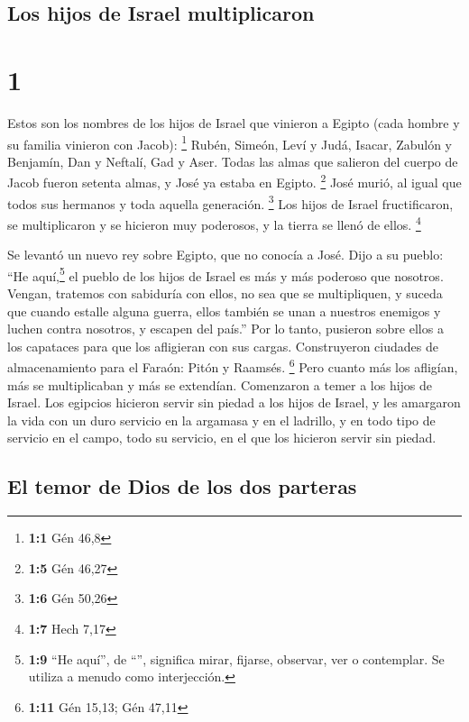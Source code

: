 \hypertarget{los-hijos-de-israel-multiplicaron}{%
\subsection{Los hijos de Israel
multiplicaron}\label{los-hijos-de-israel-multiplicaron}}

\hypertarget{section}{%
\section{1}\label{section}}

 Estos son los nombres de los hijos de Israel que vinieron
a Egipto (cada hombre y su familia vinieron con Jacob): \footnote{\textbf{1:1}
  Gén 46,8}  Rubén, Simeón, Leví y Judá, 
Isacar, Zabulón y Benjamín,  Dan y Neftalí, Gad y Aser.
 Todas las almas que salieron del cuerpo de Jacob fueron
setenta almas, y José ya estaba en Egipto. \footnote{\textbf{1:5} Gén
  46,27}  José murió, al igual que todos sus hermanos y
toda aquella generación. \footnote{\textbf{1:6} Gén 50,26}
 Los hijos de Israel fructificaron, se multiplicaron y se
hicieron muy poderosos, y la tierra se llenó de ellos. \footnote{\textbf{1:7}
  Hech 7,17}

 Se levantó un nuevo rey sobre Egipto, que no conocía a
José.  Dijo a su pueblo: ``He aquí,\footnote{\textbf{1:9}
  ``He aquí'', de ``'', significa mirar, fijarse, observar,
  ver o contemplar. Se utiliza a menudo como interjección.} el pueblo de
los hijos de Israel es más y más poderoso que nosotros. 
Vengan, tratemos con sabiduría con ellos, no sea que se multipliquen, y
suceda que cuando estalle alguna guerra, ellos también se unan a
nuestros enemigos y luchen contra nosotros, y escapen del país.''
 Por lo tanto, pusieron sobre ellos a los capataces para
que los afligieran con sus cargas. Construyeron ciudades de
almacenamiento para el Faraón: Pitón y Raamsés. \footnote{\textbf{1:11}
  Gén 15,13; Gén 47,11}  Pero cuanto más los afligían,
más se multiplicaban y más se extendían. Comenzaron a temer a los hijos
de Israel.  Los egipcios hicieron servir sin piedad a los
hijos de Israel,  y les amargaron la vida con un duro
servicio en la argamasa y en el ladrillo, y en todo tipo de servicio en
el campo, todo su servicio, en el que los hicieron servir sin piedad.

\hypertarget{el-temor-de-dios-de-los-dos-parteras}{%
\subsection{El temor de Dios de los dos
parteras}\label{el-temor-de-dios-de-los-dos-parteras}}

